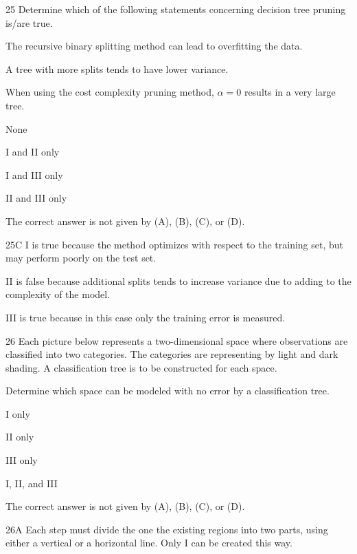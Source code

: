 \begin{question}{25}
Determine which of the following statements concerning decision tree pruning is/are true.
\begin{statements}
\item The recursive binary splitting method can lead to overfitting the data.
\item A tree with more splits tends to have lower variance.
\item When using the cost complexity pruning method, $\alpha = 0$ results in a very large tree.
\end{statements}

\begin{choices}
\item None
\item I and II only
\item I and III only
\item II and III only
\item The correct answer is not given by (A), (B), (C), or (D).
\end{choices}
\end{question}
\begin{solution}{25}{C}
I is true because the method optimizes with respect to the training set, but may perform poorly on the test set.

II is false because additional splits tends to increase variance due to adding to the complexity of the model.

III is true because in this case only the training error is measured.
\end{solution}

\begin{question}{26}
Each picture below represents a two-dimensional space where observations are classified into two categories. The categories are representing by light and dark shading. A classification tree is to be constructed for each space.

Determine which space can be modeled with no error by a classification tree.
\begin{statements}
\item {}
\item {}
\item {}
\end{statements}

\begin{choices}
\item I only
\item II only
\item III only
\item I, II, and III
\item The correct answer is not given by (A), (B), (C), or (D).
\end{choices}
\end{question}
\begin{solution}{26}{A}
Each step must divide the one the existing regions into two parts, using either a vertical or a horizontal line. Only I can be created this way.
\end{solution}

